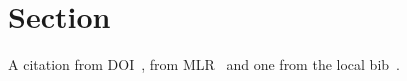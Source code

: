 \documentclass[12pt]{article}
\begin{document}
\section{Section}

A citation from DOI~\cite{DOI:10.1145/3360598}, from
MLR~\cite{MLR:v267/park25l} and one from
the local bib~\cite{hopcroft-karp}.

\printbibliography
\end{document}
